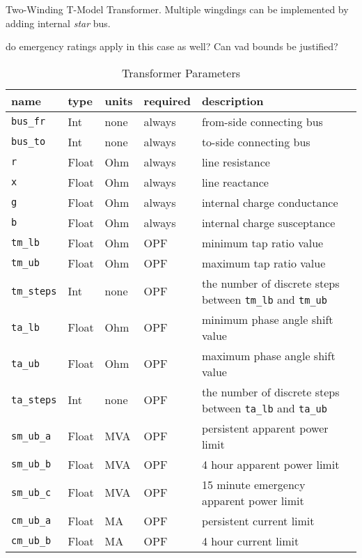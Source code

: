 \documentclass{article}
\begin{document}
Two-Winding T-Model Transformer.  Multiple wingdings can be implemented by adding internal {\em star} bus.

{\color{red} do emergency ratings apply in this case as well?  Can vad bounds be justified?}

\begin{table}[h]
\centering
\caption{Transformer Parameters}
\begin{tabular}{|l|l|l|l|p{7cm}|}
\hline
name & type & units & required & description \\ 
\hline
\hline
\texttt{bus\_fr} & Int & none & always & from-side connecting bus \\ 
\hline
\texttt{bus\_to} & Int & none & always & to-side connecting bus \\ 
\hline
\texttt{r} & Float & Ohm & always & line resistance \\ 
\hline
\texttt{x} & Float & Ohm & always & line reactance \\ 
\hline
\texttt{g} & Float & Ohm & always & internal charge conductance \\ 
\hline
\texttt{b} & Float & Ohm & always & internal charge susceptance \\ 
\hline
\texttt{tm\_lb} & Float & Ohm & OPF & minimum tap ratio value\\ 
\hline
\texttt{tm\_ub} & Float & Ohm & OPF & maximum tap ratio value \\ 
\hline
\texttt{tm\_steps} & Int & none & OPF & the number of discrete steps between \texttt{tm\_lb} and \texttt{tm\_ub} \\ 
\hline
\texttt{ta\_lb} & Float & Ohm & OPF & minimum phase angle shift value \\ 
\hline
\texttt{ta\_ub} & Float & Ohm & OPF & maximum phase angle shift value \\ 
\hline
\texttt{ta\_steps} & Int & none & OPF & the number of discrete steps between \texttt{ta\_lb} and \texttt{ta\_ub} \\ 
\hline
\texttt{sm\_ub\_a} & Float & MVA & OPF & persistent apparent power limit \\ 
\hline
\texttt{sm\_ub\_b} & Float & MVA & OPF & 4 hour apparent power limit \\ 
\hline
\texttt{sm\_ub\_c} & Float & MVA & OPF & 15 minute emergency apparent power limit \\ 
\hline
\texttt{cm\_ub\_a} & Float & MA & OPF & persistent current limit \\ 
\hline
\texttt{cm\_ub\_b} & Float & MA & OPF & 4 hour current limit \\ 

\end{tabular}
\end{table}
\end{document}
